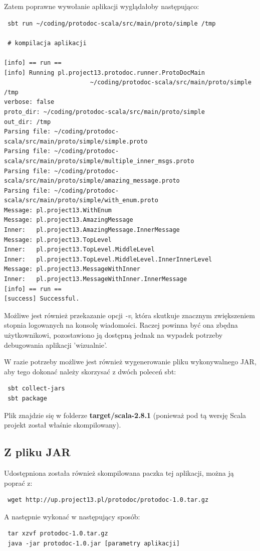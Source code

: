 \documentclass[a4paper]{article}
\begin{document}
Zatem poprawne wywołanie aplikacji wyglądałoby następująco: 
\begin{verbatim}
 sbt run ~/coding/protodoc-scala/src/main/proto/simple /tmp

 # kompilacja aplikacji

[info] == run ==
[info] Running pl.project13.protodoc.runner.ProtoDocMain 
                        ~/coding/protodoc-scala/src/main/proto/simple /tmp
verbose: false
proto_dir: ~/coding/protodoc-scala/src/main/proto/simple
out_dir: /tmp
Parsing file: ~/coding/protodoc-scala/src/main/proto/simple/simple.proto
Parsing file: ~/coding/protodoc-scala/src/main/proto/simple/multiple_inner_msgs.proto
Parsing file: ~/coding/protodoc-scala/src/main/proto/simple/amazing_message.proto
Parsing file: ~/coding/protodoc-scala/src/main/proto/simple/with_enum.proto
Message: pl.project13.WithEnum
Message: pl.project13.AmazingMessage
Inner:   pl.project13.AmazingMessage.InnerMessage
Message: pl.project13.TopLevel
Inner:   pl.project13.TopLevel.MiddleLevel
Inner:   pl.project13.TopLevel.MiddleLevel.InnerInnerLevel
Message: pl.project13.MessageWithInner
Inner:   pl.project13.MessageWithInner.InnerMessage
[info] == run ==
[success] Successful.
\end{verbatim}

Możliwe jest również przekazanie opcji \textit{-v}, która skutkuje znacznym zwiększeniem stopnia logowanych na konsolę wiadomości.
Raczej powinna być ona zbędna użytkownikowi, pozostawiono ją dostępną jednak na wypadek potrzeby debugowania aplikacji 'wizualnie'.

W razie potrzeby możliwe jest również wygenerowanie pliku wykonywalnego JAR, aby tego dokonać należy skorzysać z dwóch poleceń sbt:
\begin{verbatim}
 sbt collect-jars
 sbt package
\end{verbatim}
Plik znajdzie się w folderze \textbf{target/scala-2.8.1} (ponieważ pod tą wersję Scala projekt został właśnie skompilowany).

\subsection{Z pliku JAR}
Udostępniona została również skompilowana paczka tej aplikacji, można ją poprać z:
\begin{verbatim}
 wget http://up.project13.pl/protodoc/protodoc-1.0.tar.gz
\end{verbatim}
A następnie wykonać w następujący sposób:
\begin{verbatim}
 tar xzvf protodoc-1.0.tar.gz
 java -jar protodoc-1.0.jar [parametry aplikacji]
\end{verbatim}
\end{document}
